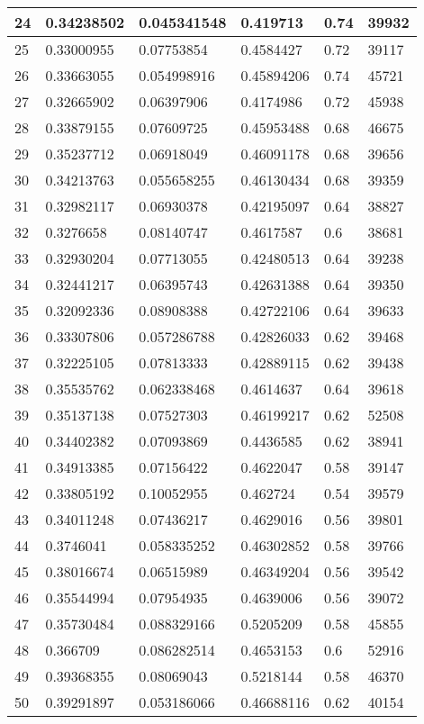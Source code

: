 \begin{longtable}{|l|l|l|l|l|l|}
24 & 0.34238502 & 0.045341548 & 0.419713 & 0.74 & 39932 \\ \hline 
25 & 0.33000955 & 0.07753854 & 0.4584427 & 0.72 & 39117 \\ \hline 
26 & 0.33663055 & 0.054998916 & 0.45894206 & 0.74 & 45721 \\ \hline 
27 & 0.32665902 & 0.06397906 & 0.4174986 & 0.72 & 45938 \\ \hline 
28 & 0.33879155 & 0.07609725 & 0.45953488 & 0.68 & 46675 \\ \hline 
29 & 0.35237712 & 0.06918049 & 0.46091178 & 0.68 & 39656 \\ \hline 
30 & 0.34213763 & 0.055658255 & 0.46130434 & 0.68 & 39359 \\ \hline 
31 & 0.32982117 & 0.06930378 & 0.42195097 & 0.64 & 38827 \\ \hline 
32 & 0.3276658 & 0.08140747 & 0.4617587 & 0.6 & 38681 \\ \hline 
33 & 0.32930204 & 0.07713055 & 0.42480513 & 0.64 & 39238 \\ \hline 
34 & 0.32441217 & 0.06395743 & 0.42631388 & 0.64 & 39350 \\ \hline 
35 & 0.32092336 & 0.08908388 & 0.42722106 & 0.64 & 39633 \\ \hline 
36 & 0.33307806 & 0.057286788 & 0.42826033 & 0.62 & 39468 \\ \hline 
37 & 0.32225105 & 0.07813333 & 0.42889115 & 0.62 & 39438 \\ \hline 
38 & 0.35535762 & 0.062338468 & 0.4614637 & 0.64 & 39618 \\ \hline 
39 & 0.35137138 & 0.07527303 & 0.46199217 & 0.62 & 52508 \\ \hline 
40 & 0.34402382 & 0.07093869 & 0.4436585 & 0.62 & 38941 \\ \hline 
41 & 0.34913385 & 0.07156422 & 0.4622047 & 0.58 & 39147 \\ \hline 
42 & 0.33805192 & 0.10052955 & 0.462724 & 0.54 & 39579 \\ \hline 
43 & 0.34011248 & 0.07436217 & 0.4629016 & 0.56 & 39801 \\ \hline 
44 & 0.3746041 & 0.058335252 & 0.46302852 & 0.58 & 39766 \\ \hline 
45 & 0.38016674 & 0.06515989 & 0.46349204 & 0.56 & 39542 \\ \hline 
46 & 0.35544994 & 0.07954935 & 0.4639006 & 0.56 & 39072 \\ \hline 
47 & 0.35730484 & 0.088329166 & 0.5205209 & 0.58 & 45855 \\ \hline 
48 & 0.366709 & 0.086282514 & 0.4653153 & 0.6 & 52916 \\ \hline 
49 & 0.39368355 & 0.08069043 & 0.5218144 & 0.58 & 46370 \\ \hline 
50 & 0.39291897 & 0.053186066 & 0.46688116 & 0.62 & 40154 \\ \hline 
\end{longtable}